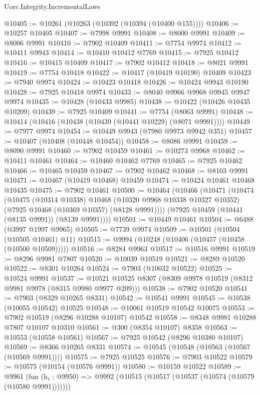 \begin{lexlean}{Uorc.Integrity.IncrementalLaws}
\begin{coremodule}
@10405 := @10261 (@10263 (@10392 (@10394 (@10400 @155))))
@10406 := @10257 @10405
@10407 := @7998 @9991
@10408 := @8000 @9991
@10409 := @8006 @9991
@10410 := @7902 @10409
@10411 := @7754 @9974
@10412 := @10411 @9943
@10414 := @10410 @10412 @7769
@10415 := @7925 @10412
@10416 := @10415 @10409
@10417 := @7902 @10412
@10418 := @8021 @9991
@10419 := @7754 @10418
@10422 := @10417 (@10419 @10190) @10409
@10423 := @7940 @9974
@10424 := @10423 @10418
@10426 := @10424 @9943 @10190
@10428 := @7925 @10418 @9974
@10433 := @8040 @9966 @9968 @9945 @9947 @9974
@10435 := @10428 (@10433 @9985)
@10438 := @10422 (@10426 @10435 @10209)
@10439 := @7925 @10409
@10441 := @7754 (@8063 @9991)
@10448 := @10414 (@10416 (@10438 (@10439 (@10441 @10229) (@8071 @9991))))
@10449 := @7977 @9974
@10454 := @10449 @9943 (@7980 @9973 @9942 @351)
@10457 := @10407 (@10408 (@10448 @10454))
@10458 := @8086 @9991
@10459 := @8090 @9991
@10460 := @7902 @10459
@10461 := @10273 @9968
@10462 := @10411 @10461
@10464 := @10460 @10462 @7769
@10465 := @7925 @10462
@10466 := @10465 @10459
@10467 := @7902 @10462
@10468 := @8103 @9991
@10471 := @10467 (@10419 @10468) @10459
@10474 := @10424 @10461 @10468 @10435
@10475 := @7902 @10461
@10500 := @10464
    (@10466
      (@10471
        (@10474
          (@10475
            (@10314 @10338)
            @10468
            (@10320 @9968 @10338 @10327 @10352)
            (@7925 @10468 (@10369 @10357) (@8128 @9991))))
        (@7925 @10459 (@10441 (@8135 @9991)) (@8139 @9991))))
@10501 := @10449 @10461
@10504 := @6488 (@3997 @1997 @9965)
@10505 := @7739 @9974
@10509 := @10501 (@10504 (@10505 @10461) @11)
@10515 := @9994 (@10248 (@10406 (@10457 (@10458 (@10500 @10509)))))
@10516 := @8284 @9963
@10517 := @10516 @9991
@10519 := @8296 @9981 @7807
@10520 := @10039 @10519
@10521 := @8289 @10520
@10522 := @8301 @10264
@10524 := @7903 (@10032 @10522)
@10525 := @10524 @9991
@10537 := @10521 @10525 @8307 (@8309 @9978 @10519 (@8312 @9981 @9978 (@8315 @9980 @9977 @209)))
@10538 := @7902 @10520
@10541 := @7903 (@8329 @10265 @8331)
@10542 := @10541 @9991
@10545 := @10538 (@10055 @10542) @10525
@10548 := @10061 @10519 @10542 @10075
@10553 := @7902 @10519 (@8296 @10288 @10107) @10542
@10558 := @8348 @9981 @10288 @7807 @10107 @10310
@10561 := @300 (@8354 @10107) @8358
@10563 := @10553 (@10558 @10561)
@10567 := @7925 @10542 (@8296 @10380 @10107)
@10569 := @8366 @10265 @8331
@10574 := @10545 (@10548 (@10563 (@10567 (@10569 @9991))))
@10575 := @7925 @10525
@10576 := @7903 @10522
@10579 := @10575 (@10154 (@10576 @9991))
@10580 := @10159 @10522
@10589 := @9961
    (fun (h₁ : @9950) => @9992 (@10515 (@10517 (@10537 (@10574 (@10579 (@10580 @9991)))))))

\end{coremodule}
\end{lexlean}
